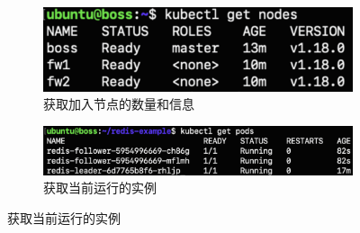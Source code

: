 \documentclass{article}
\begin{document}
\begin{figure}[H]
    \begin{subfigure}[b]{0.3\textwidth}
        \centering
        \includegraphics[width=\textwidth]{nodes.png}
        \caption{获取加入节点的数量和信息}
        \label{fig:nodes1}
    \end{subfigure}
    \hfill
    \begin{subfigure}[b]{0.65\textwidth}
        \centering
        \includegraphics[width=\textwidth]{pods.png}
        \caption{获取当前运行的实例}
        \label{fig:pods1}
    \end{subfigure}
\end{figure}
\end{document}
